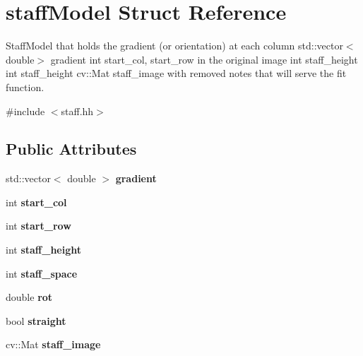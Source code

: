 \hypertarget{structstaffModel}{}\section{staff\+Model Struct Reference}
\label{structstaffModel}


Staff\+Model that holds the gradient (or orientation) at each column  std\+::vector$<$double$>$ gradient  int start\+\_\+col, start\+\_\+row in the original image  int staff\+\_\+height  int staff\+\_\+height  cv\+::\+Mat staff\+\_\+image with removed notes that will serve the fit function.  




{\ttfamily \#include $<$staff.\+hh$>$}

\subsection*{Public Attributes}
\begin{DoxyCompactItemize}
\item 
std\+::vector$<$ double $>$ {\bfseries gradient}\hypertarget{structstaffModel_ad7c27f74adc4c0e43f386626b6bd5d7c}{}\label{structstaffModel_ad7c27f74adc4c0e43f386626b6bd5d7c}

\item 
int {\bfseries start\+\_\+col}\hypertarget{structstaffModel_a8fdc6f1c9d6ef75ae02e00e912a7828d}{}\label{structstaffModel_a8fdc6f1c9d6ef75ae02e00e912a7828d}

\item 
int {\bfseries start\+\_\+row}\hypertarget{structstaffModel_a4d471ca2f466f3b80803301a3cdf8cec}{}\label{structstaffModel_a4d471ca2f466f3b80803301a3cdf8cec}

\item 
int {\bfseries staff\+\_\+height}\hypertarget{structstaffModel_a3ed822731271793dbc5453cb64461cb4}{}\label{structstaffModel_a3ed822731271793dbc5453cb64461cb4}

\item 
int {\bfseries staff\+\_\+space}\hypertarget{structstaffModel_a5f9b6132c149b9a60e24f5dce762bf82}{}\label{structstaffModel_a5f9b6132c149b9a60e24f5dce762bf82}

\item 
double {\bfseries rot}\hypertarget{structstaffModel_a3d3b38a25be760503f84757dc6ac4875}{}\label{structstaffModel_a3d3b38a25be760503f84757dc6ac4875}

\item 
bool {\bfseries straight}\hypertarget{structstaffModel_a177b18144dd24f3f8fd7a59005483e37}{}\label{structstaffModel_a177b18144dd24f3f8fd7a59005483e37}

\item 
cv\+::\+Mat {\bfseries staff\+\_\+image}\hypertarget{structstaffModel_aa440a358aa5f0e11b1e5a04449bede97}{}\label{structstaffModel_aa440a358aa5f0e11b1e5a04449bede97}

\end{DoxyCompactItemize}


